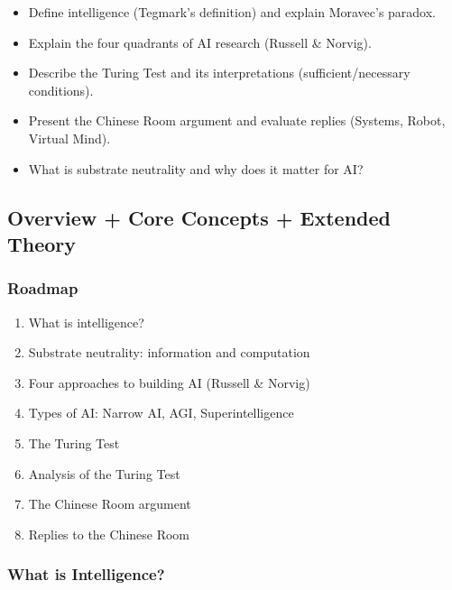 \begin{itemize}
  \item Define intelligence (Tegmark's definition) and explain Moravec's paradox.
  \item Explain the four quadrants of AI research (Russell \& Norvig).
  \item Describe the Turing Test and its interpretations (sufficient/necessary conditions).
  \item Present the Chinese Room argument and evaluate replies (Systems, Robot, Virtual Mind).
  \item What is substrate neutrality and why does it matter for AI?
\end{itemize}

\bigseparator

\subsection{Overview + Core Concepts + Extended Theory}

\subsubsection*{Roadmap}
\begin{enumerate}
  \item What is intelligence?
  \item Substrate neutrality: information and computation
  \item Four approaches to building AI (Russell \& Norvig)
  \item Types of AI: Narrow AI, AGI, Superintelligence
  \item The Turing Test
  \item Analysis of the Turing Test
  \item The Chinese Room argument
  \item Replies to the Chinese Room
\end{enumerate}

\bigseparator

\subsubsection{What is Intelligence?}


